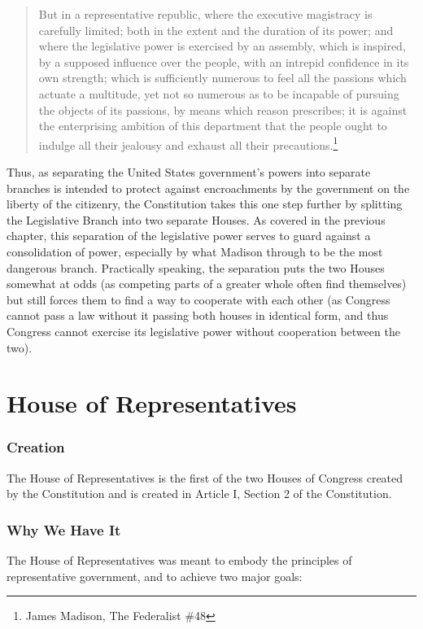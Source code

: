 \begin{quote}
But in a representative republic, where the executive magistracy is carefully limited; both in the extent and the duration of its power; and where the legislative power is exercised by an assembly, which is inspired, by a supposed influence over the people, with an intrepid confidence in its own strength; which is sufficiently numerous to feel all the passions which actuate a multitude, yet not so numerous as to be incapable of pursuing the objects of its passions, by means which reason prescribes; it is against the enterprising ambition of this department that the people ought to indulge all their jealousy and exhaust all their precautions.\footnote{James Madison, The Federalist \#48}
\end{quote}

Thus, as separating the United States government's powers into separate branches is intended to protect against encroachments by the government on the liberty of the citizenry, the Constitution takes this one step further by splitting the Legislative Branch into two separate Houses.  As covered in the previous chapter, this separation of the legislative power serves to guard against a consolidation of power, especially by what Madison through to be the most dangerous branch.  Practically speaking, the separation puts the two Houses somewhat at odds (as competing parts of a greater whole often find themselves) but still forces them to find a way to cooperate with each other (as Congress cannot pass a law without it passing both houses in identical form, and thus Congress cannot exercise its legislative power without cooperation between the two).

\section{House of Representatives}

\subsubsection{Creation}
The House of Representatives is the first of the two Houses of Congress created by the Constitution and is created in Article I, Section 2 of the Constitution.

\subsubsection{Why We Have It}
The House of Representatives was meant to embody the principles of representative government, and to achieve two major goals:

